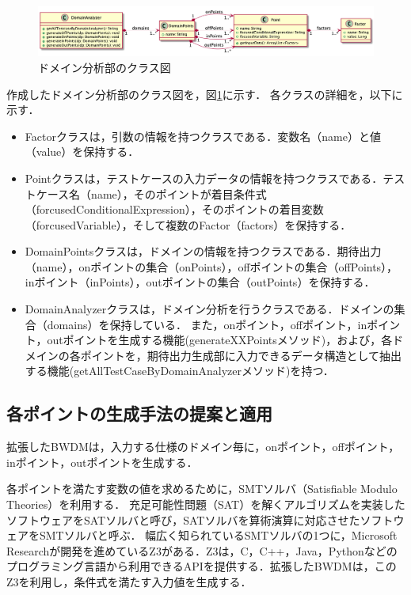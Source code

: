 \documentclass[uplatex, report, a4j, 10pt]{jsbook}
\begin{document}
\begin{figure}[t]
  \begin{center}
    \includegraphics[keepaspectratio, width=160mm]{figs/DomainAnalyzer.png}
    \caption{ドメイン分析部のクラス図}
    \label{fig:class_DomainAnalyzer}
  \end{center}
\end{figure}

作成したドメイン分析部のクラス図を，図\ref{fig:class_DomainAnalyzer}に示す．
各クラスの詳細を，以下に示す．

\begin{itemize}
  \item
        Factorクラスは，引数の情報を持つクラスである．変数名（name）と値（value）を保持する．
  \item
        Pointクラスは，テストケースの入力データの情報を持つクラスである．テストケース名（name），そのポイントが着目条件式（forcusedConditionalExpression），そのポイントの着目変数（forcusedVariable），そして複数のFactor（factors）を保持する．
  \item
        DomainPointsクラスは，ドメインの情報を持つクラスである．期待出力（name），onポイントの集合（onPoints），offポイントの集合（offPoints），inポイント（inPoints），outポイントの集合（outPoints）を保持する．
  \item
        DomainAnalyzerクラスは，ドメイン分析を行うクラスである．ドメインの集合（domains）を保持している．
        また，onポイント，offポイント，inポイント，outポイントを生成する機能(generateXXPointsメソッド)，および，各ドメインの各ポイントを，期待出力生成部に入力できるデータ構造として抽出する機能(getAllTestCaseByDomainAnalyzerメソッド)を持つ．

\end{itemize}

\subsection{各ポイントの生成手法の提案と適用}\label{cha:create_point}
拡張したBWDMは，入力する仕様のドメイン毎に，onポイント，offポイント，inポイント，outポイントを生成する．

各ポイントを満たす変数の値を求めるために，SMTソルバ（Satisfiable Modulo Theories）\cite{sat}を利用する．
充足可能性問題（SAT）を解くアルゴリズムを実装したソフトウェアをSATソルバと呼び，SATソルバを算術演算に対応させたソフトウェアをSMTソルバと呼ぶ．
幅広く知られているSMTソルバの1つに，Microsoft Researchが開発を進めているZ3\cite{z3}がある．Z3は，C，C++，Java，Pythonなどのプログラミング言語から利用できるAPIを提供する．拡張したBWDMは，このZ3を利用し，条件式を満たす入力値を生成する．
\end{document}
